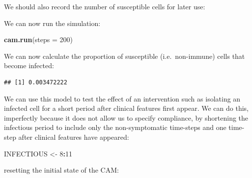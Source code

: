 \documentclass[12pt,a4paper]{book}
\newenvironment{Shaded}{\begin{snugshade}}{\end{snugshade}}
\newcommand{\DataTypeTok}[1]{\textcolor[rgb]{0.13,0.29,0.53}{#1}}
\newcommand{\DecValTok}[1]{\textcolor[rgb]{0.00,0.00,0.81}{#1}}
\newcommand{\KeywordTok}[1]{\textcolor[rgb]{0.13,0.29,0.53}{\textbf{#1}}}
\newcommand{\NormalTok}[1]{#1}
\newcommand{\OperatorTok}[1]{\textcolor[rgb]{0.81,0.36,0.00}{\textbf{#1}}}
\newcommand{\StringTok}[1]{\textcolor[rgb]{0.31,0.60,0.02}{#1}}
\theoremstyle{definition}
\theoremstyle{definition}
\theoremstyle{definition}
\theoremstyle{remark}
\begin{document}
We should also record the number of susceptible cells for later use:

\begin{Shaded}
\end{Shaded}

We can now run the simulation:

\begin{Shaded}
\begin{Highlighting}[]
\KeywordTok{cam.run}\NormalTok{(}\DataTypeTok{steps =} \DecValTok{200}\NormalTok{)}
\end{Highlighting}
\end{Shaded}

We can now calculate the proportion of susceptible (i.e.~non-immune)
cells that become infected:

\begin{Shaded}
\end{Shaded}

\begin{verbatim}
## [1] 0.003472222
\end{verbatim}

We can use this model to test the effect of an intervention such as
isolating an infected cell for a short period after clinical features
first appear. We can do this, imperfectly because it does not allow us
to specify compliance, by shortening the infectious period to include
only the non-symptomatic time-steps and one time- step after clinical
features have appeared:

\begin{Shaded}
\begin{Highlighting}[]
\NormalTok{INFECTIOUS <-}\StringTok{ }\DecValTok{8}\OperatorTok{:}\DecValTok{11}
\end{Highlighting}
\end{Shaded}

resetting the initial state of the CAM:
\end{document}
